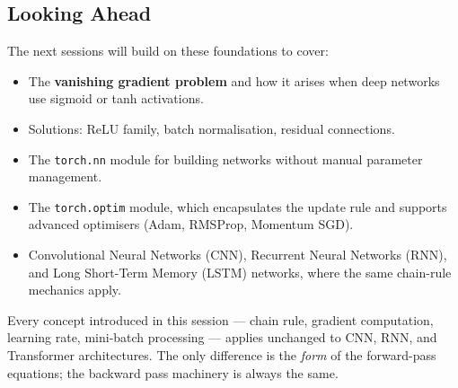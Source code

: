 \documentclass[12pt,a4paper]{article}
\begin{document}
\subsection{Looking Ahead}

The next sessions will build on these foundations to cover:
\begin{itemize}[leftmargin=2em]
  \item The \textbf{vanishing gradient problem} and how it arises when
        deep networks use sigmoid or tanh activations.
  \item Solutions: ReLU family, batch normalisation, residual connections.
  \item The \texttt{torch.nn} module for building networks without manual
        parameter management.
  \item The \texttt{torch.optim} module, which encapsulates the update rule
        and supports advanced optimisers (Adam, RMSProp, Momentum SGD).
  \item Convolutional Neural Networks (CNN), Recurrent Neural Networks
        (RNN), and Long Short-Term Memory (LSTM) networks, where the same
        chain-rule mechanics apply.
\end{itemize}

\begin{keyinsight}[title=Universality of backpropagation]
Every concept introduced in this session --- chain rule, gradient
computation, learning rate, mini-batch processing --- applies unchanged to
CNN, RNN, and Transformer architectures.
The only difference is the \emph{form} of the forward-pass equations;
the backward pass machinery is always the same.
\end{keyinsight}
\end{document}
